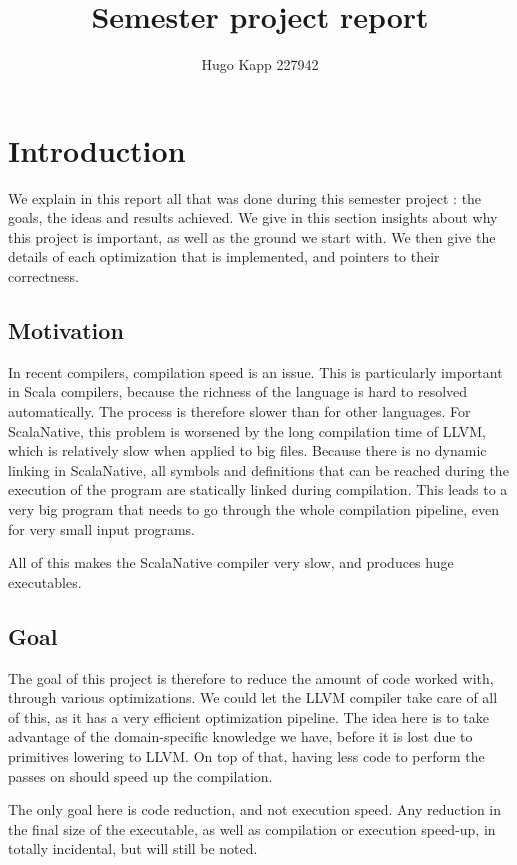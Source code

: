 \documentclass[11pt,a4paper]{article}
\author{Hugo Kapp 227942}
\title{Semester project report}
\begin{document}
\maketitle

\section{Introduction}

We explain in this report all that was done during this semester project : the goals, the ideas and results achieved. We give in this section insights about why this project is important, as well as the ground we start with. We then give the details of each optimization that is implemented, and pointers to their correctness.

\subsection{Motivation}

In recent compilers, compilation speed is an issue. This is particularly important in Scala compilers, because the richness of the language is hard to resolved automatically. The process is therefore slower than for other languages. For ScalaNative, this problem is worsened by the long compilation time of LLVM, which is relatively slow when applied to big files. Because there is no dynamic linking in ScalaNative, all symbols and definitions that can be reached during the execution of the program are statically linked during compilation. This leads to a very big program that needs to go through the whole compilation pipeline, even for very small input programs.

All of this makes the ScalaNative compiler very slow, and produces huge executables.

\subsection{Goal}

The goal of this project is therefore to reduce the amount of code worked with, through various optimizations. We could let the LLVM compiler take care of all of this, as it has a very efficient optimization pipeline. The idea here is to take advantage of the domain-specific knowledge we have, before it is lost due to primitives lowering to LLVM. On top of that, having less code to perform the passes on should speed up the compilation.

The only goal here is code reduction, and not execution speed. Any reduction in the final size of the executable, as well as compilation or execution speed-up, in totally incidental, but will still be noted.
\end{document}
